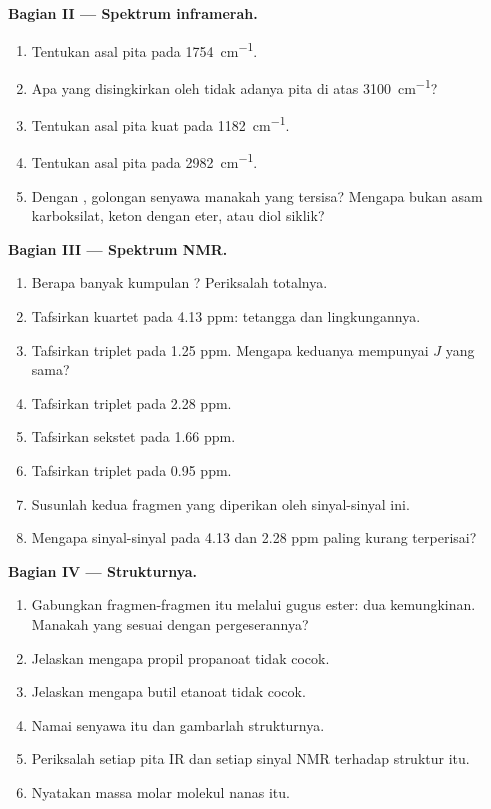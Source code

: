\begin{problem}
\medskip
\noindent\textbf{Bagian II --- Spektrum inframerah.}
\begin{enumerate}[resume]
  \item Tentukan asal pita pada \qty{1754}{cm^{-1}}.
  \item Apa yang disingkirkan oleh tidak adanya pita di atas
        \qty{3100}{cm^{-1}}?
  \item Tentukan asal pita kuat pada \qty{1182}{cm^{-1}}.
  \item Tentukan asal pita pada \qty{2982}{cm^{-1}}.
  \item Dengan , golongan senyawa manakah yang
        tersisa? Mengapa bukan asam karboksilat, keton dengan eter, atau
        diol siklik?
\end{enumerate}

\medskip
\noindent\textbf{Bagian III --- Spektrum NMR.}
\begin{enumerate}[resume]
  \item Berapa banyak kumpulan ? Periksalah 
        totalnya.
  \item Tafsirkan kuartet pada 4.13 ppm: tetangga dan lingkungannya.
  \item Tafsirkan triplet pada 1.25 ppm. Mengapa keduanya mempunyai $J$
        yang sama?
  \item Tafsirkan triplet pada 2.28 ppm.
  \item Tafsirkan sekstet pada 1.66 ppm.
  \item Tafsirkan triplet pada 0.95 ppm.
  \item Susunlah kedua fragmen yang diperikan oleh sinyal-sinyal ini.
  \item Mengapa sinyal-sinyal pada 4.13 dan 2.28 ppm paling kurang
        terperisai?
\end{enumerate}

\medskip
\noindent\textbf{Bagian IV --- Strukturnya.}
\begin{enumerate}[resume]
  \item Gabungkan fragmen-fragmen itu melalui gugus ester: dua
        kemungkinan. Manakah yang sesuai dengan pergeserannya?
  \item Jelaskan mengapa propil propanoat tidak cocok.
  \item Jelaskan mengapa butil etanoat tidak cocok.
  \item Namai senyawa itu dan gambarlah strukturnya.
  \item Periksalah setiap pita IR dan setiap sinyal NMR terhadap struktur
        itu.
  \item Nyatakan massa molar molekul nanas itu.
\end{enumerate}
\end{problem}
